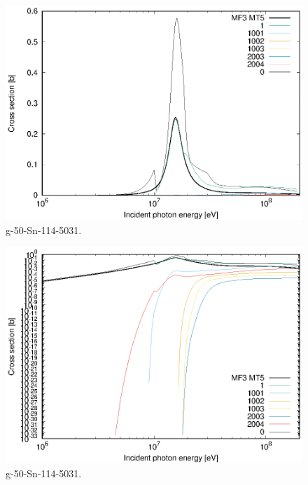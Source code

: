 \begin{figure}
 \includegraphics[width=\linewidth]{eps/g_50-Sn-114_5031.eps}
  \caption{g-50-Sn-114-5031.}
\end{figure}
\begin{figure}
 \includegraphics[width=\linewidth]{eps-log/g_50-Sn-114_5031.eps}
 \caption{g-50-Sn-114-5031.}
\end{figure}
\newpage \clearpage

